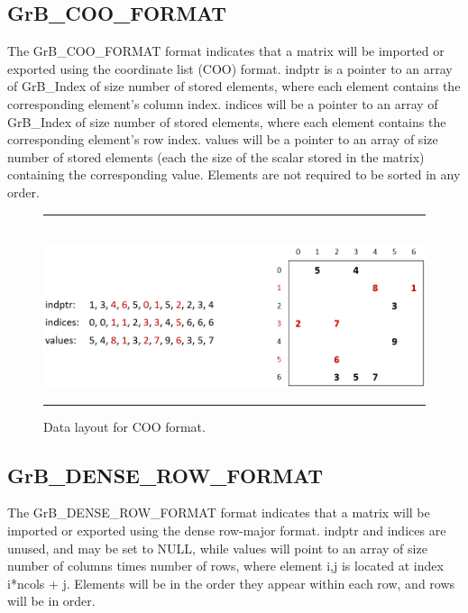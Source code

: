 \subsection{{\sf GrB\_COO\_FORMAT}}

The {\sf GrB\_COO\_FORMAT} format
indicates that a matrix will be imported or exported using the coordinate list
(COO) format.  {\sf indptr} is a pointer to an array of {\sf GrB\_Index} of size 
number of stored elements,
where each element contains the corresponding element's column index.
{\sf indices} will be a pointer to an array of {\sf GrB\_Index} of size 
number of stored elements, where each
element contains the corresponding element's row index.
{\sf values} will be a pointer to an array of size number of
stored elements (each the size of the scalar stored in the matrix) containing the corresponding value. Elements
are not required to be sorted in any order.

\begin{figure}[h]
    \hrule
    \begin{center}
        ~\\
        \includegraphics[width=4.5in]{GrB_COO_FORMAT.png}
    \end{center}
    \vspace{-1em}
    \caption{Data layout for COO format.}
    \label{Fig:COO_format}
    \hrule
\end{figure}

\subsection{{\sf GrB\_DENSE\_ROW\_FORMAT}}

The {\sf GrB\_DENSE\_ROW\_FORMAT} format indicates that a matrix will be imported
or exported using the dense row-major format.  {\sf indptr} and {\sf indices} are unused,
and may be set to NULL, while {\sf values} will point to an array of size number of columns
times number of rows, where element i,j is located at index i*ncols + j. Elements will be
in the order they appear within each row, and rows will be in order.

